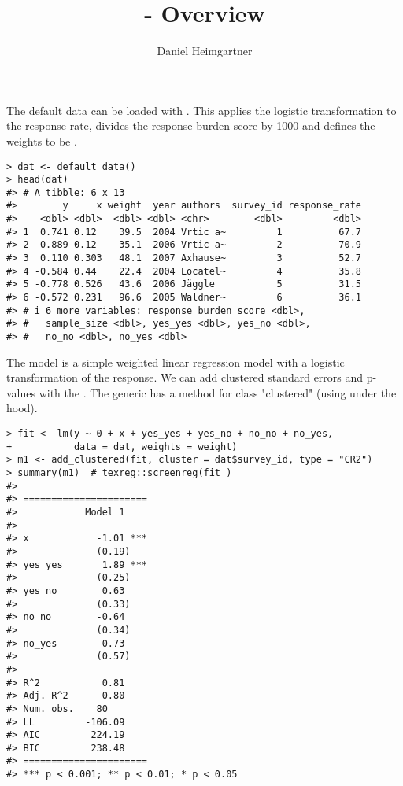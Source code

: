 \documentclass[a4paper]{article}\usepackage[]{graphicx}\usepackage[]{xcolor}
\title{\responseRateAnalysis{} - Overview}
\author{Daniel Heimgartner}
\makeatletter
\newenvironment{kframe}{%
 \def\at@end@of@kframe{}%
 \ifinner\ifhmode%
  \def\at@end@of@kframe{\end{minipage}}%
  \begin{minipage}{\columnwidth}%
 \fi\fi%
 \def\FrameCommand##1{\hskip\@totalleftmargin \hskip-\fboxsep
 \colorbox{shadecolor}{##1}\hskip-\fboxsep
     \hskip-\linewidth \hskip-\@totalleftmargin \hskip\columnwidth}%
 \MakeFramed {\advance\hsize-\width
   \@totalleftmargin\z@ \linewidth\hsize
   \@setminipage}}%
 {\par\unskip\endMakeFramed%
 \at@end@of@kframe}
\newenvironment{knitrout}{}{} %
\makeatother
\begin{document}
\maketitle






The default data can be loaded with . This applies the logistic transformation to the response rate, divides the response burden score by 1000 and defines the weights to be .

\begin{knitrout}
\color{fgcolor}\begin{kframe}
\begin{verbatim}
> dat <- default_data()
> head(dat)
#> # A tibble: 6 x 13
#>        y     x weight  year authors  survey_id response_rate
#>    <dbl> <dbl>  <dbl> <dbl> <chr>        <dbl>         <dbl>
#> 1  0.741 0.12    39.5  2004 Vrtic a~         1          67.7
#> 2  0.889 0.12    35.1  2006 Vrtic a~         2          70.9
#> 3  0.110 0.303   48.1  2007 Axhause~         3          52.7
#> 4 -0.584 0.44    22.4  2004 Locatel~         4          35.8
#> 5 -0.778 0.526   43.6  2006 Jäggle           5          31.5
#> 6 -0.572 0.231   96.6  2005 Waldner~         6          36.1
#> # i 6 more variables: response_burden_score <dbl>,
#> #   sample_size <dbl>, yes_yes <dbl>, yes_no <dbl>,
#> #   no_no <dbl>, no_yes <dbl>
\end{verbatim}
\end{kframe}
\end{knitrout}

The model is a simple weighted linear regression model with a logistic transformation of the response. We can add clustered standard errors and p-values with the . The  generic has a method for class "clustered" (using  under the hood).

\begin{knitrout}
\color{fgcolor}\begin{kframe}
\begin{verbatim}
> fit <- lm(y ~ 0 + x + yes_yes + yes_no + no_no + no_yes,
+           data = dat, weights = weight)
> m1 <- add_clustered(fit, cluster = dat$survey_id, type = "CR2")
> summary(m1)  # texreg::screenreg(fit_)
#> 
#> ======================
#>            Model 1    
#> ----------------------
#> x            -1.01 ***
#>              (0.19)   
#> yes_yes       1.89 ***
#>              (0.25)   
#> yes_no        0.63    
#>              (0.33)   
#> no_no        -0.64    
#>              (0.34)   
#> no_yes       -0.73    
#>              (0.57)   
#> ----------------------
#> R^2           0.81    
#> Adj. R^2      0.80    
#> Num. obs.    80       
#> LL         -106.09    
#> AIC         224.19    
#> BIC         238.48    
#> ======================
#> *** p < 0.001; ** p < 0.01; * p < 0.05
\end{verbatim}
\end{kframe}
\end{knitrout}
\end{document}

